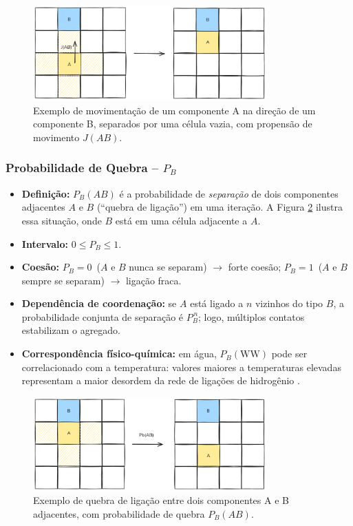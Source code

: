 \documentclass[12pt,oneside]{report}
\begin{document}
\begin{figure}[H]
    \centering
    \includegraphics[width=0.8\textwidth]{img/Jab.png}
    \caption{\small Exemplo de movimentação de um componente A na direção de um componente B, separados por uma célula vazia, com propensão de movimento $J(AB)$.}
    \label{fig:movimentacao_juncao}
\end{figure}

\subsubsection{Probabilidade de Quebra – \texorpdfstring{$P_B$}{Pb}}
\label{subsubsec:Pb}

\begin{itemize}
    \item \textbf{Definição:} $P_B(AB)$ é a probabilidade de
          \emph{separação} de dois componentes adjacentes $A$ e $B$
          (``quebra de ligação'') em uma iteração. A Figura \ref{fig:quebra_ligacao} ilustra essa situação, onde $B$ está em uma célula adjacente a $A$.
    \item \textbf{Intervalo:} $0 \le P_B \le 1$.
    \item \textbf{Coesão:} $P_B=0$ \,($A$ e $B$ nunca se separam)
          $\rightarrow$ forte coesão;
          $P_B=1$ \,($A$ e $B$ sempre se separam) $\rightarrow$ ligação fraca.
    \item \textbf{Dependência de coordenação:} se $A$ está ligado a
          $n$ vizinhos do tipo $B$, a probabilidade conjunta de separação é
          $P_B^{\,n}$; logo, múltiplos contatos estabilizam o agregado.
    \item \textbf{Correspondência físico-química:}
          em água, $P_B(\mathrm{WW})$ pode ser correlacionado com a temperatura:
          valores maiores a temperaturas elevadas representam a maior
          desordem da rede de ligações de hidrogênio \cite{kier2005}.
\end{itemize}

\begin{figure}[H]
    \centering
    \includegraphics[width=0.8\textwidth]{img/PbAB.png}
    \caption{\small Exemplo de quebra de ligação entre dois componentes A e B adjacentes, com probabilidade de quebra $P_B(AB)$.}
    \label{fig:quebra_ligacao}
\end{figure}
\end{document}
